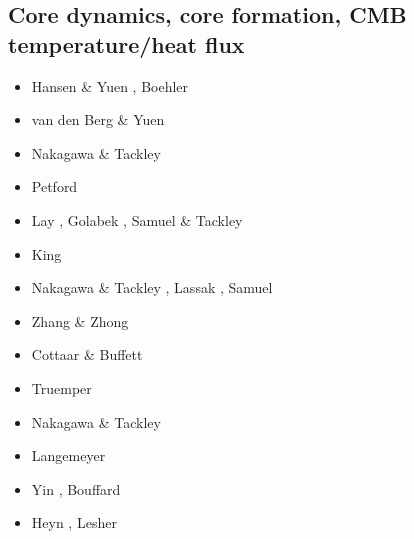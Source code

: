 \subsection{Core dynamics, core formation, CMB temperature/heat flux}

\begin{scriptsize}
\begin{itemize}
\item[\nineteenninetysix] Hansen \& Yuen \cite{hayu96}, Boehler \cite{boeh96}
\item[\nineteenninetyeight] van den Berg \& Yuen \cite{vayu98}
\item[\twothousandfour] Nakagawa \& Tackley \cite{nata04c}
\item[\twothousandseven] Petford \etal \cite{pery07}
\item[\twothousandeight] Lay \etal \cite{lahb08}, Golabek \etal \cite{gost08}, Samuel \& Tackley \cite{sata08}
\item[\twothousandnine] King \etal \cite{kisn09}\\
\item[\twothousandten] Nakagawa \& Tackley \cite{nata10}, Lassak \etal \cite{lamg10}, 
                       Samuel \etal \cite{sate10}
\item[\twothousandeleven] Zhang \& Zhong  \cite{zhzh11}
\item[\twothousandtwelve] Cottaar \& Buffett  \cite{cobu12}
\item[\twothousandtwelve] Truemper \etal  \cite{trbh12}
\item[\twothousandthirteen] Nakagawa \& Tackley  \cite{nata13}
\item[\twothousandeighteen] Langemeyer \etal  \cite{lalt18}
\item[\twothousandnineteen] Yin \etal  \cite{yiym19}, Bouffard \etal \cite{bocl19}
\item[\twothousandtwenty] Heyn \etal \cite{hect20}, Lesher \etal \cite{ledb20}
\end{itemize}
\end{scriptsize}

